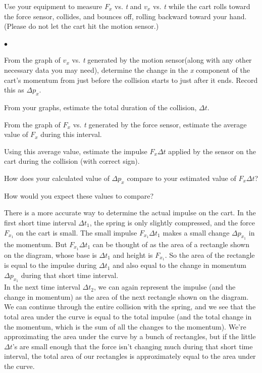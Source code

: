 \documentclass[11pt]{article}
\newcommand{\squishlist}{
   \begin{list}{$\bullet$}
    { \setlength{\itemsep}{0pt}      \setlength{\parsep}{3pt}
      \setlength{\topsep}{3pt}       \setlength{\partopsep}{0pt}
      \setlength{\leftmargin}{1.5em} \setlength{\labelwidth}{1em}
      \setlength{\labelsep}{0.5em} } }
\newcommand{\squishend}{
    \end{list}  }
\begin{document}
Use your equipment to measure $F_x$ vs. \textit{t} and $v_x$ vs. \textit{t} while the cart rolls toward the force sensor, collides, and bounces off, rolling backward toward your hand. (Please do not let the cart hit the motion sensor.)

\squishlist
\item  From the graph of $v_x$ vs. \textit{t} generated by the motion sensor(along with any other necessary data you may need), determine the change in the \textit{x} component of the cart's momentum from just before the collision starts to just after it ends. Record this as $\Delta p_x$.

\item From your graphs, estimate the total duration of the collision, $\Delta t$.

\item  From the graph of $F_x$ vs. \textit{t} generated by the force sensor, estimate the average value of $F_x$ during this interval.

\item  Using this average value, estimate the impulse $F_x \Delta t$ applied by the sensor on the cart during the collision (with correct sign).

\item  How does your calculated value of $\Delta p_x$ compare to your estimated value of $F_x \Delta t$?

\item  How would you expect these values to compare?\\
\squishend

There is a more accurate way to determine the actual impulse on the cart. In the first short time interval $\Delta t_1$, the spring is only slightly compressed, and the force $F_{x_1}$ on the cart is small. The small impulse $F_{x_1} \Delta t_1$ makes a small change $\Delta p_{x_1}$ in the momentum. But $F_{x_1} \Delta t_1$ can be thought of as the area of a rectangle shown on the diagram, whose base is $\Delta t_1$ and height is $F_{x_1}$. So the area of the rectangle is equal to the impulse during $\Delta t_1$ and also equal to the change in momentum $\Delta p_{x_1}$ during that short time interval.\\

In the next time interval $\Delta t_2$, we can again represent the impulse (and the change in momentum) as the area of the next rectangle shown on the diagram. We can continue through the entire collision with the spring, and we see that the total area under the curve is equal to the total impulse (and the total change in the momentum, which is the sum of all the changes to the momentum). We're approximating the area under the curve by a bunch of rectangles, but if the little $\Delta t$'s are small enough that the force isn't changing much during that short time interval, the total area of our rectangles is approximately equal to the area under the curve.\\
\end{document}
